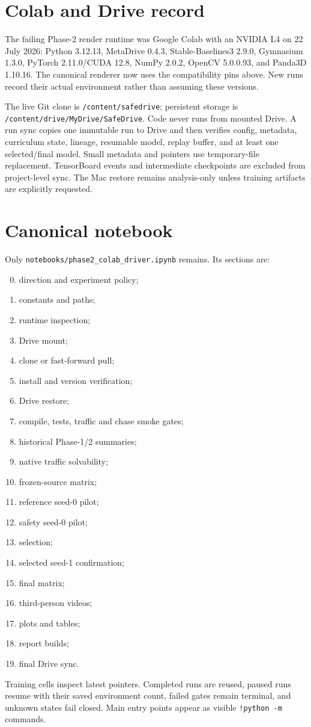 \documentclass[10pt,twocolumn]{article}
\begin{document}
\section{Colab and Drive record}
The failing Phase-2 render runtime was Google Colab with an NVIDIA L4 on 22 July 2026:
Python 3.12.13, MetaDrive 0.4.3, Stable-Baselines3 2.9.0, Gymnasium 1.3.0,
PyTorch 2.11.0/CUDA 12.8, NumPy 2.0.2, OpenCV 5.0.0.93, and Panda3D 1.10.16.
The canonical renderer now uses the compatibility pins above. New runs record their
actual environment rather than assuming these versions.

The live Git clone is \texttt{/content/safedrive}; persistent storage is
\texttt{/content/drive/MyDrive/SafeDrive}. Code never runs from mounted Drive. A run sync
copies one immutable run to Drive and then verifies config, metadata, curriculum state,
lineage, resumable model, replay buffer, and at least one selected/final model. Small
metadata and pointers use temporary-file replacement. TensorBoard events and intermediate
checkpoints are excluded from project-level sync. The Mac restore remains analysis-only
unless training artifacts are explicitly requested.

\section{Canonical notebook}
Only \texttt{notebooks/phase2\_colab\_driver.ipynb} remains. Its sections are:
\begin{enumerate}
\setcounter{enumi}{-1}
\item direction and experiment policy;
\item constants and paths;
\item runtime inspection;
\item Drive mount;
\item clone or fast-forward pull;
\item install and version verification;
\item Drive restore;
\item compile, tests, traffic and chase smoke gates;
\item historical Phase-1/2 summaries;
\item native traffic solvability;
\item frozen-source matrix;
\item reference seed-0 pilot;
\item safety seed-0 pilot;
\item selection;
\item selected seed-1 confirmation;
\item final matrix;
\item third-person videos;
\item plots and tables;
\item report builds;
\item final Drive sync.
\end{enumerate}
Training cells inspect latest pointers. Completed runs are reused, paused runs resume with
their saved environment count, failed gates remain terminal, and unknown states fail
closed. Main entry points appear as visible \texttt{!python -m} commands.
\end{document}
